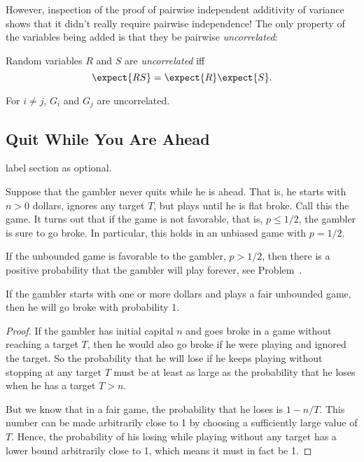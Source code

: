 However, inspection of the proof of pairwise independent additivity of
variance shows that it didn't really require pairwise independence!  The
only property of the variables being added is that they be pairwise
\emph{uncorrelated}:

\begin{definition*}
Random variables $R$ and $S$ are \emph{uncorrelated} iff
\begin{equation}\label{LN12:uncor}
\expect{RS} = \expect{R}\expect{S}.
\end{equation}
\end{definition*}

\begin{lemma}\label{LN12:Guncor}
For $i \neq j$, $G_i$ and $G_j$ are uncorrelated.
\end{lemma}
\fi

\subsection{Quit While You Are Ahead}

\begin{editingnotes}
label section as optional.
\end{editingnotes}

Suppose that the gambler never quits while he is ahead.  That is, he
starts with $n>0$ dollars, ignores any target $T$, but plays until he
is flat broke.  Call this the  game.
It turns out that if the game is not favorable, that is, $p \leq 1/2$,
the gambler is sure to go broke.  In particular, this holds in an
unbiased game with $p = 1/2$.

\begin{editingnotes}
If the unbounded game is favorable to the gambler, \ie $p>1/2$, then
there is a positive probability that the gambler will play forever,
see Problem~.
\end{editingnotes}

\begin{lemma}\label{LN12:go broke}
If the gambler starts with one or more dollars and plays a fair
unbounded game, then he will go broke with probability 1.
\end{lemma}

\begin{proof}
If the gambler has initial capital $n$ and goes broke in a game without
reaching a target $T$, then he would also go broke if he were playing and
ignored the target.  So the probability that he will lose if he keeps
playing without stopping at any target $T$ must be at least as large as the
probability that he loses when he has a target $T>n$.

But we know that in a fair game, the probability that he loses is $1 -
n/T$.  This number can be made arbitrarily close to 1 by choosing a
sufficiently large value of $T$.  Hence, the probability of his losing
while playing without any target has a lower bound arbitrarily close to 1,
which means it must in fact be 1.
\end{proof}

